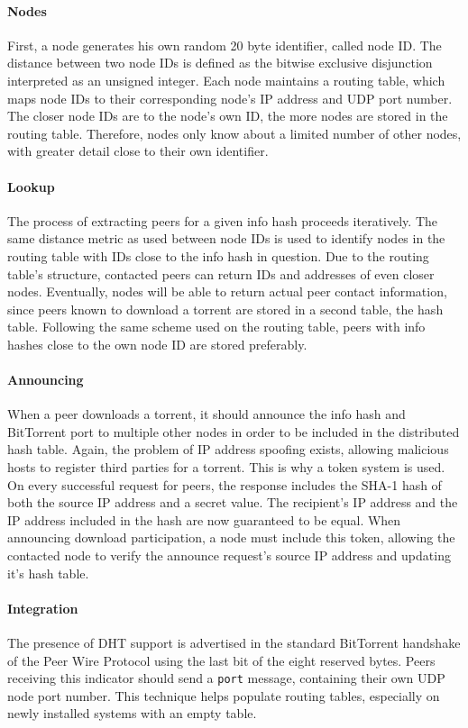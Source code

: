 \documentclass[10pt, a4paper]{scrartcl} %
\renewcommand{\_}{\origunderscore\allowbreak}
\begin{document}
\paragraph{Nodes}
First, a node generates his own random 20 byte identifier, called node ID. The distance between two node IDs is defined as the bitwise exclusive disjunction interpreted as an unsigned integer. Each node maintains a routing table, which maps node IDs to their corresponding node's IP address and UDP port number. The closer node IDs are to the node's own ID, the more nodes are stored in the routing table. Therefore, nodes only know about a limited number of other nodes, with greater detail close to their own identifier.

\paragraph{Lookup}
The process of extracting peers for a given info hash proceeds iteratively. The same distance metric as used between node IDs is used to identify nodes in the routing table with IDs close to the info hash in question. Due to the routing table's structure, contacted peers can return IDs and addresses of even closer nodes. Eventually, nodes will be able to return actual peer contact information, since peers known to download a torrent are stored in a second table, the hash table. Following the same scheme used on the routing table, peers with info hashes close to the own node ID are stored preferably.

\paragraph{Announcing}
When a peer downloads a torrent, it should announce the info hash and BitTorrent port to multiple other nodes in order to be included in the distributed hash table. Again, the problem of IP address spoofing exists, allowing malicious hosts to register third parties for a torrent. This is why a token system is used. On every successful request for peers, the response includes the SHA-1 hash of both the source IP address and a secret value. The recipient's IP address and the IP address included in the hash are now guaranteed to be equal. When announcing download participation, a node must include this token, allowing the contacted node to verify the announce request's source IP address and updating it's hash table.

\paragraph{Integration}
The presence of DHT support is advertised in the standard BitTorrent handshake of the Peer Wire Protocol using the last bit of the eight reserved bytes. Peers receiving this indicator should send a \texttt{port} message, containing their own UDP node port number. This technique helps populate routing tables, especially on newly installed systems with an empty table.
\end{document}

